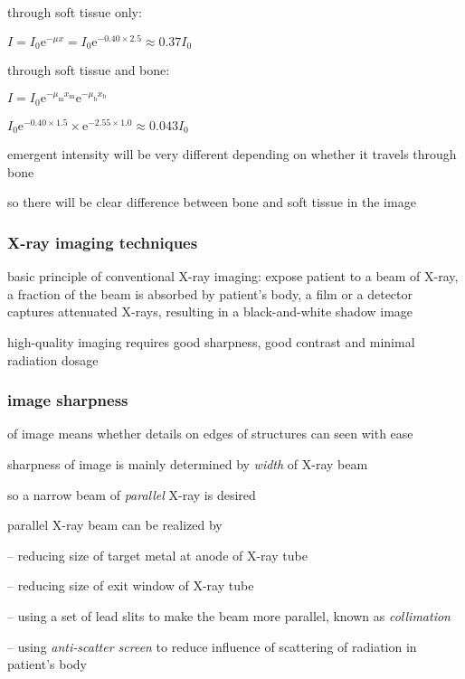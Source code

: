 \sol through soft tissue only:

{
	\centering
	
	$ I = I_0 \mathrm{e}^{-\mu x} = I_0 \mathrm{e}^{-0.40\times2.5} \approx 0.37 I_0$
	
}

through soft tissue and bone:

{
	\centering
	
	$ I = I_0 \mathrm{e}^{-\mu_\text{m} x_\text{m}} \mathrm{e}^{-\mu_\text{b} x_\text{b}}$
	
	$I_0 \mathrm{e}^{-0.40\times1.5} \times \mathrm{e}^{-2.55\times1.0}  \approx 0.043 I_0$
	
}

emergent intensity will be very different depending on whether it travels through bone

so there will be clear difference between bone and soft tissue in the image \eoe



\subsubsection{X-ray imaging techniques}

basic principle of conventional X-ray imaging: expose patient to a beam of X-ray, a fraction of the beam is absorbed by patient's body, a film or a detector captures attenuated X-rays, resulting in a black-and-white shadow image

high-quality imaging requires good sharpness, good contrast and minimal radiation dosage

\subsubsection*{image sharpness}

 of image means whether details on edges of structures can seen with ease
	
sharpness of image is mainly determined by \emph{width} of X-ray beam

so a narrow beam of \emph{parallel} X-ray is desired

\cmt parallel X-ray beam can be realized by

\begin{compactitem}
	\item[--] reducing size of target metal at anode of X-ray tube
	
	\item[--] reducing size of exit window of X-ray tube
	
	\item[--] using a set of lead slits to make the beam more parallel, known as \emph{collimation}
	
	\item[--] using \emph{anti-scatter screen} to reduce influence of scattering of radiation in patient's body

\end{compactitem}

